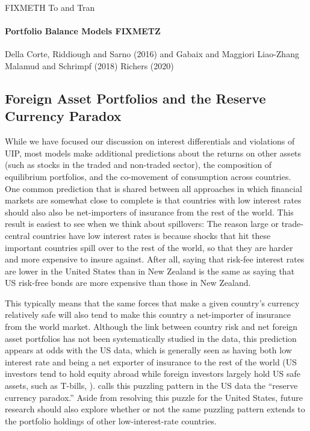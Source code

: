 \documentclass{ar-1col}
\begin{document}
FIXMETH To and Tran


\paragraph*{Portfolio Balance Models FIXMETZ}

Della Corte, Riddiough and Sarno (2016) and Gabaix and Maggiori Liao-Zhang Malamud and Schrimpf (2018) Richers (2020)






 
\begin{textbox}[h]
\section{Foreign Asset Portfolios and the Reserve Currency Paradox} While we have focused our discussion on interest differentials and violations of UIP, most models make additional predictions about the returns on other assets (such as stocks in the traded and non-traded sector), the composition of equilibrium portfolios, and the co-movement of consumption across countries. One common prediction that is shared between all approaches in which financial markets are somewhat close to complete is that countries with low interest rates should also also be net-importers of insurance from the rest of the world. This result is easiest to see when we think about spillovers: The reason large or trade-central countries have low interest rates is because shocks that hit these important countries spill over to the rest of the world, so that they are harder and more expensive to insure against. After all, saying that risk-fee interest rates are lower in the United States than in New Zealand is the same as saying that US risk-free bonds are more expensive than those in New Zealand.

This typically means that the same forces that make a given country's currency relatively safe will also tend to make this country a net-importer of insurance from the world market. Although the link between country risk and net foreign asset portfolios has not been systematically studied in the data, this prediction appears at odds with the US data, which is generally seen as having both low interest rate and being a net exporter of insurance to the rest of the world (US investors tend to hold equity abroad while foreign investors largely hold US safe assets, such as T-bills, \citep{GourinchasRey2007,GourinchasGovillotRey2017}). \cite{Maggiori2013} calls this puzzling pattern in the US data the ``reserve currency paradox.'' Aside from resolving this puzzle for the United States, future research should also explore whether or not the same puzzling pattern extends to the portfolio holdings of other low-interest-rate countries. 

\end{textbox}
\end{document}
